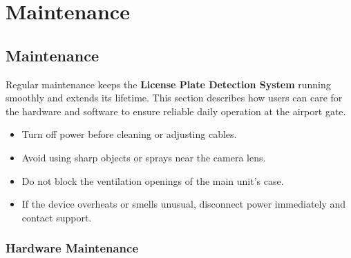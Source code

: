 \chapter{Maintenance}

\section{Maintenance}

Regular maintenance keeps the \textbf{License Plate Detection System} running smoothly and extends its lifetime.  
This section describes how users can care for the hardware and software to ensure reliable daily operation at the airport gate.

\begin{tcolorbox}[colback=blue!5!white,colframe=blue!60!black,
	title={\hspace{0.5em}Important}, fonttitle=\bfseries]
	\begin{itemize}
		\item Turn off power before cleaning or adjusting cables.  
		\item Avoid using sharp objects or sprays near the camera lens.  
		\item Do not block the ventilation openings of the main unit's case.  
		\item If the device overheats or smells unusual, disconnect power immediately and contact support.
	\end{itemize}
\end{tcolorbox}


\subsection{Hardware Maintenance}

